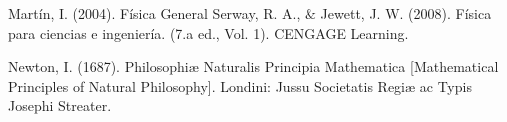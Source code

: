 \documentclass{article}
\begin{document}
\begin{thebibliography}{9}						%
		Martín, I. (2004). Física General
		Serway, R. A., $\&$ Jewett, J. W. (2008). Física para ciencias e ingeniería. (7.a
ed., Vol. 1). CENGAGE Learning.

	Newton, I. (1687). Philosophiæ Naturalis Principia Mathematica [Mathematical Principles of Natural Philosophy]. Londini: Jussu Societatis Regiæ ac Typis Josephi Streater.
\end{thebibliography}
\end{document}
